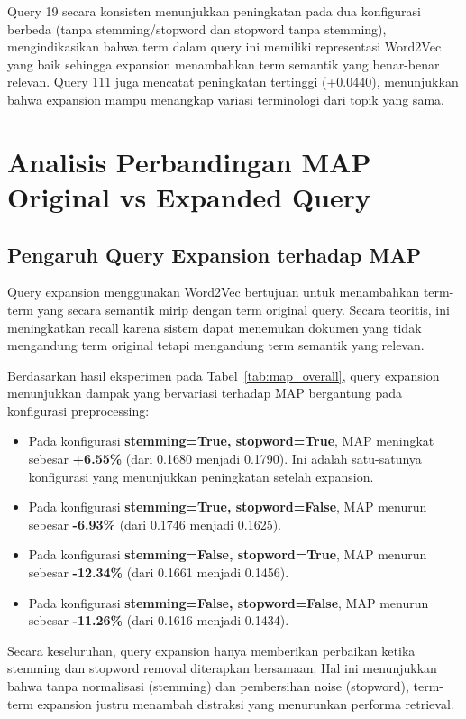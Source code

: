 \documentclass[12pt,a4paper]{report}
\begin{document}
Query 19 secara konsisten menunjukkan peningkatan pada dua konfigurasi berbeda (tanpa stemming/stopword dan stopword tanpa stemming), mengindikasikan bahwa term dalam query ini memiliki representasi Word2Vec yang baik sehingga expansion menambahkan term semantik yang benar-benar relevan. Query 111 juga mencatat peningkatan tertinggi (+0.0440), menunjukkan bahwa expansion mampu menangkap variasi terminologi dari topik yang sama.

\section{Analisis Perbandingan MAP Original vs Expanded Query}

\subsection{Pengaruh Query Expansion terhadap MAP}
Query expansion menggunakan Word2Vec bertujuan untuk menambahkan term-term yang secara semantik mirip dengan term original query. Secara teoritis, ini meningkatkan recall karena sistem dapat menemukan dokumen yang tidak mengandung term original tetapi mengandung term semantik yang relevan.

Berdasarkan hasil eksperimen pada Tabel~\ref{tab:map_overall}, query expansion menunjukkan dampak yang bervariasi terhadap MAP bergantung pada konfigurasi preprocessing:
\begin{itemize}
    \item Pada konfigurasi \textbf{stemming=True, stopword=True}, MAP meningkat sebesar \textbf{+6.55\%} (dari 0.1680 menjadi 0.1790). Ini adalah satu-satunya konfigurasi yang menunjukkan peningkatan setelah expansion.
    \item Pada konfigurasi \textbf{stemming=True, stopword=False}, MAP menurun sebesar \textbf{-6.93\%} (dari 0.1746 menjadi 0.1625).
    \item Pada konfigurasi \textbf{stemming=False, stopword=True}, MAP menurun sebesar \textbf{-12.34\%} (dari 0.1661 menjadi 0.1456).
    \item Pada konfigurasi \textbf{stemming=False, stopword=False}, MAP menurun sebesar \textbf{-11.26\%} (dari 0.1616 menjadi 0.1434).
\end{itemize}
Secara keseluruhan, query expansion hanya memberikan perbaikan ketika stemming dan stopword removal diterapkan bersamaan. Hal ini menunjukkan bahwa tanpa normalisasi (stemming) dan pembersihan noise (stopword), term-term expansion justru menambah distraksi yang menurunkan performa retrieval.
\end{document}
